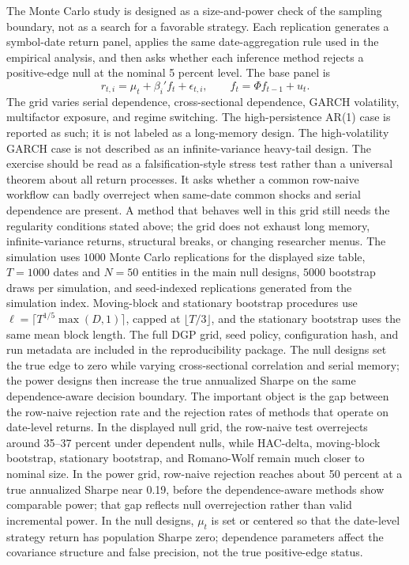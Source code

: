 \documentclass[12pt,a4paper]{article}
\begin{document}
The Monte Carlo study is designed as a size-and-power check of the
sampling boundary, not as a search for a favorable strategy.  Each
replication generates a symbol-date return panel, applies the same
date-aggregation rule used in the empirical analysis, and then asks
whether each inference method rejects a positive-edge null at the
nominal 5 percent level.  The base panel is
\[
  r_{t,i}=\mu_t+\beta_i'f_t+\epsilon_{t,i},
  \qquad
  f_t=\Phi f_{t-1}+u_t .
\]
The grid varies serial dependence, cross-sectional dependence, GARCH
volatility, multifactor exposure, and regime switching.  The
high-persistence AR(1) case is reported as such; it is not labeled as a
long-memory design.  The high-volatility GARCH case is not described as
an infinite-variance heavy-tail design.
The exercise should be read as a falsification-style stress test rather
than a universal theorem about all return processes.  It asks whether a
common row-naive workflow can badly overreject when same-date common
shocks and serial dependence are present.  A method that behaves well in
this grid still needs the regularity conditions stated above; the grid
does not exhaust long memory, infinite-variance returns, structural
breaks, or changing researcher menus.
The simulation uses \(1000\) Monte Carlo replications for the
displayed size table, \(T=1000\) dates and \(N=50\) entities in the
main null designs, \(5000\) bootstrap draws per simulation, and
seed-indexed replications generated from the simulation index.
Moving-block and stationary bootstrap procedures use
\(\ell=\lceil T^{1/5}\max(D,1)\rceil\), capped at
\(\lfloor T/3\rfloor\), and the stationary bootstrap uses the same mean
block length.  The full DGP grid, seed policy, configuration hash, and
run metadata are included in the reproducibility package.
The null designs set the true edge to zero while varying
cross-sectional correlation and serial memory; the power designs then
increase the true annualized Sharpe on the same dependence-aware
decision boundary.  The important object is the gap between the
row-naive rejection rate and the rejection rates of methods that operate
on date-level returns.  In the displayed null grid, the row-naive test
overrejects around 35--37 percent under dependent nulls, while HAC-delta,
moving-block bootstrap, stationary bootstrap, and Romano-Wolf remain much
closer to nominal size.  In the power grid, row-naive rejection reaches
about 50 percent at a true annualized Sharpe near 0.19, before the
dependence-aware methods show comparable power; that gap reflects null
overrejection rather than valid incremental power.
In the null designs, \(\mu_t\) is set or centered so that the date-level
strategy return has population Sharpe zero; dependence parameters affect
the covariance structure and false precision, not the true positive-edge
status.
\end{document}
